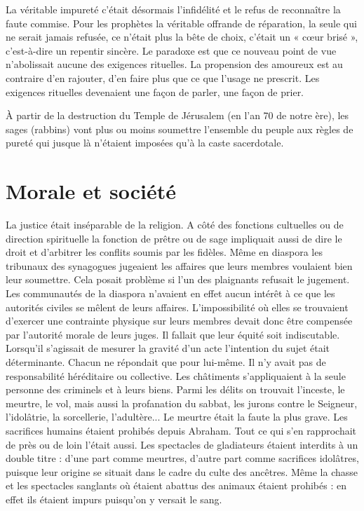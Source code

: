  La véritable impureté c'était désormais l'infidélité et le refus de reconnaître la faute commise. Pour les prophètes la véritable offrande de réparation, la seule qui ne serait jamais refusée, ce n'était plus la bête de choix, c'était un « cœur brisé », c'est-à-dire un repentir sincère. Le paradoxe est que ce nouveau point de vue n'abolissait aucune des exigences rituelles. La propension des amoureux est au contraire d'en rajouter, d'en faire plus que ce que l'usage ne prescrit. Les exigences rituelles devenaient une façon de parler, une façon de prier. 

 À partir de la destruction du Temple de Jérusalem (en l'an 70 de notre ère), les sages (rabbins) vont plus ou moins soumettre l'ensemble du peuple aux règles de pureté qui jusque là n'étaient imposées qu'à la caste sacerdotale.

\section{Morale et société}

 La justice était inséparable de la religion. A côté des fonctions cultuelles ou de direction spirituelle la fonction de prêtre ou de sage impliquait aussi de dire le droit et d'arbitrer les conflits soumis par les fidèles. Même en diaspora les tribunaux des synagogues jugeaient les affaires que leurs membres voulaient bien leur soumettre. Cela posait problème si l'un des plaignants refusait le jugement. Les communautés de la diaspora n'avaient en effet aucun intérêt à ce que les autorités civiles se mêlent de leurs affaires. L'impossibilité où elles se trouvaient d'exercer une contrainte physique sur leurs membres devait donc être compensée par l'autorité morale de leurs juges. Il fallait que leur équité soit indiscutable. Lorsqu'il s'agissait de mesurer la gravité d'un acte l'intention du sujet était déterminante. Chacun ne répondait que pour lui-même. Il n'y avait pas de responsabilité héréditaire ou collective. Les châtiments s'appliquaient à la seule personne des criminels et à leurs biens. Parmi les délits on trouvait l'inceste, le meurtre, le vol, mais aussi la profanation du sabbat, les jurons contre le Seigneur, l'idolâtrie, la sorcellerie, l'adultère... Le meurtre était la faute la plus grave. Les sacrifices humains étaient prohibés depuis Abraham. Tout ce qui s'en rapprochait de près ou de loin l'était aussi. Les spectacles de gladiateurs étaient interdits à un double titre : d'une part comme meurtres, d'autre part comme sacrifices idolâtres, puisque leur origine se situait dans le cadre du culte des ancêtres. Même la chasse et les spectacles sanglants où étaient abattus des animaux étaient prohibés : en effet ils étaient impurs puisqu'on y versait le sang. 

